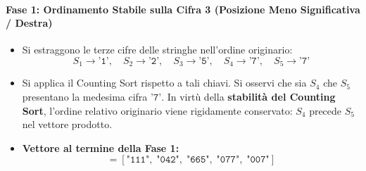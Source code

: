 \begin{table}[H]
\centering
\small
{}
\caption{Configurazione tabellare iniziale delle chiavi numeriche per l'algoritmo LSD Radix Sort.}
\label{tab:lsd-initial-state}
\end{table}

\paragraph{Fase 1: Ordinamento Stabile sulla Cifra 3 (Posizione Meno Significativa / Destra)}
\begin{itemize}
  \item Si estraggono le terze cifre delle stringhe nell'ordine originario:
  \begin{equation}
    S_1 \to \texttt{'1'}, \quad S_2 \to \texttt{'2'}, \quad S_3 \to \texttt{'5'}, \quad S_4 \to \texttt{'7'}, \quad S_5 \to \texttt{'7'}
  \end{equation}
  \item Si applica il Counting Sort rispetto a tali chiavi. Si osservi che sia $S_4$ che $S_5$ presentano la medesima cifra $\texttt{'7'}$. In virt\`u della \textbf{stabilit\`a del Counting Sort}, l'ordine relativo originario viene rigidamente conservato: $S_4$ precede $S_5$ nel vettore prodotto.
  \item \textbf{Vettore al termine della Fase 1:}
  \begin{equation}
    [S_1, \; S_2, \; S_3, \; S_4, \; S_5] = [\texttt{"111"}, \; \texttt{"042"}, \; \texttt{"665"}, \; \texttt{"077"}, \; \texttt{"007"}]
  \end{equation}
\end{itemize}

